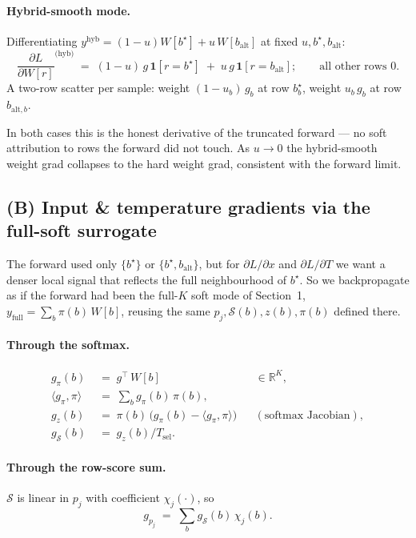 \documentclass[11pt]{article}
\newcommand{\R}{\mathbb{R}}
\newcommand{\Tsel}{T_{\mathrm{sel}}}
\newcommand{\bstar}{b^{\star}}
\begin{document}
\paragraph{Hybrid-smooth mode.} Differentiating $y^{\text{hyb}} = (1-u) W[\bstar] + u\, W[b_{\text{alt}}]$ at fixed $u, \bstar, b_{\text{alt}}$:
\[
\frac{\partial L}{\partial W[r]}^{\text{(hyb)}} \;=\; (1-u)\,g\,\mathbf{1}[r = \bstar] \;+\; u\,g\,\mathbf{1}[r = b_{\text{alt}}];
\qquad \text{all other rows } 0.
\]
A two-row scatter per sample: weight $(1-u_b)\,g_b$ at row $\bstar_b$, weight $u_b\,g_b$ at row $b_{\text{alt},b}$.

In both cases this is the honest derivative of the truncated forward — no soft attribution to rows the forward did not touch. As $u \to 0$ the hybrid-smooth weight grad collapses to the hard weight grad, consistent with the forward limit.

\subsection*{(B) Input \& temperature gradients via the full-soft surrogate}

The forward used only $\{\bstar\}$ or $\{\bstar, b_{\text{alt}}\}$, but for $\partial L/\partial x$ and $\partial L / \partial T$ we want a denser local signal that reflects the full neighbourhood of $\bstar$. So we backpropagate as if the forward had been the full-$K$ soft mode of Section~1, $y_{\text{full}} = \sum_b \pi(b)\, W[b]$, reusing the same $p_j, \mathcal S(b), z(b), \pi(b)$ defined there.

\paragraph{Through the softmax.}
\begin{align*}
g_{\pi}(b) &\;=\; g^{\top}\,W[b]                                                 && \in\R^K, \\
\langle g_\pi, \pi\rangle &\;=\; \sum_b g_\pi(b)\,\pi(b),                                       \\
g_{z}(b)  &\;=\; \pi(b)\,\bigl(g_{\pi}(b) - \langle g_\pi, \pi\rangle\bigr) && (\text{softmax Jacobian}), \\
g_{\mathcal S}(b) &\;=\; g_z(b)/\Tsel.
\end{align*}

\paragraph{Through the row-score sum.} $\mathcal S$ is linear in $p_j$ with coefficient $\chi_j(\cdot)$, so
\[
g_{p_j} \;=\; \sum_b g_{\mathcal S}(b)\, \chi_j(b).
\]
\end{document}

